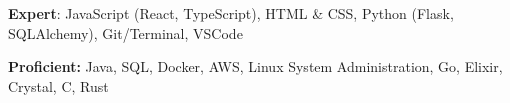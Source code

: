  \textbf{Expert}: JavaScript (React, TypeScript), HTML \& CSS, Python (Flask, SQLAlchemy), Git/Terminal, VSCode

 \textbf{Proficient:} Java, SQL, Docker, AWS, Linux System Administration, Go, Elixir, Crystal, C, Rust